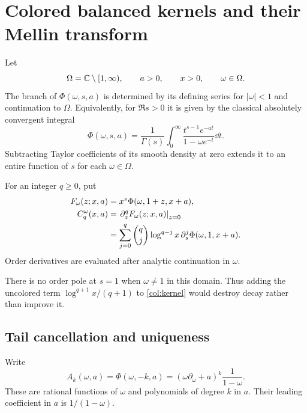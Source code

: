 \section{Colored balanced kernels and their Mellin transform}
\label{sec:colored}

Let
\[
 \Omega=\mathbb C\setminus[1,\infty),\qquad a>0,\qquad x>0,\qquad \omega\in\Omega.
\]
The branch of $\Phi(\omega,s,a)$ is determined by its defining series
for $|\omega|<1$ and continuation to $\Omega$. Equivalently, for
$\Re s>0$ it is given by the classical absolutely convergent integral
\cite[25.14.5]{dlmflerch}
\begin{equation}\label{col:lerch-integral}
 \Phi(\omega,s,a)=\frac1{\Gamma(s)}
  \int_0^\infty\frac{t^{s-1}e^{-at}}{1-\omega e^{-t}}\dd t.
\end{equation}
Subtracting Taylor coefficients of its smooth density at zero extends
it to an entire function of $s$ for each $\omega\in\Omega$.

\begin{definition}\label{col:def}
For an integer $q\ge0$, put
\begin{align}
 F_\omega(z;x,a)&=x^z\Phi(\omega,1+z,x+a),\label{col:generator}\\
 C_q^\omega(x,a)&=\left.\partial_z^qF_\omega(z;x,a)\right|_{z=0}\notag\\
 &=\sum_{j=0}^q\binom qj\log^{q-j}x\,
       \partial_s^j\Phi(\omega,1,x+a).\label{col:kernel}
\end{align}
Order derivatives are evaluated after analytic continuation in $\omega$.
\end{definition}

There is no order pole at $s=1$ when $\omega\ne1$ in this domain.
Thus adding the uncolored term $\log^{q+1}x/(q+1)$ to
\eqref{col:kernel} would destroy decay rather than improve it.

\subsection{Tail cancellation and uniqueness}

Write
\begin{equation}\label{col:A}
 A_k(\omega,a)=\Phi(\omega,-k,a)
       =(\omega\partial_\omega+a)^k\frac1{1-\omega}.
\end{equation}
These are rational functions of $\omega$ and polynomials of degree $k$
in $a$. Their leading coefficient in $a$ is $1/(1-\omega)$.

